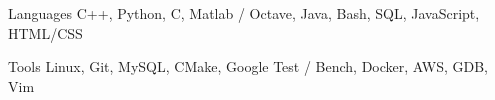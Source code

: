 

\begin{cvskills}

  \cvskill
    {Languages} %
    {C++, Python, C, Matlab / Octave, Java, Bash, SQL, JavaScript, HTML/CSS}

  \vspace{-3mm}\cvskill
    {Tools} %
    {Linux, Git, MySQL, CMake, Google Test / Bench, Docker, AWS, GDB, Vim}

\end{cvskills}
